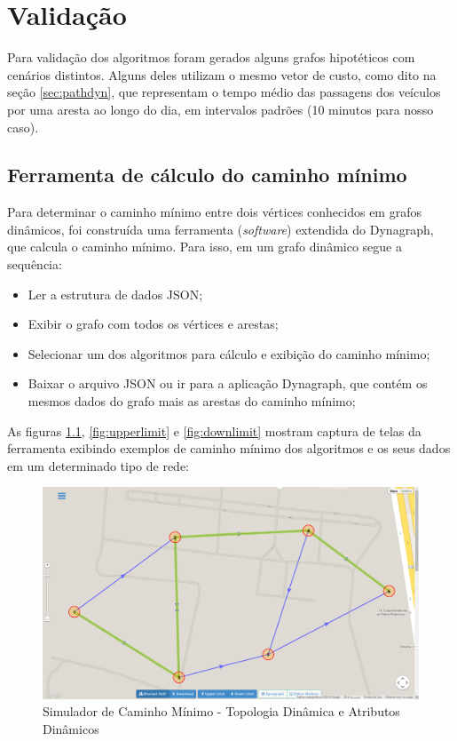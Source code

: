 \chapter{Validação}

Para validação dos algoritmos foram gerados alguns grafos hipotéticos com cenários distintos.
Alguns deles utilizam o mesmo vetor de custo, como dito na seção \ref{sec:pathdyn}, que representam
o tempo médio das passagens dos veículos por uma aresta ao longo do dia, em intervalos padrões (10 minutos para nosso caso).

\section{Ferramenta de cálculo do caminho mínimo}
Para determinar o caminho mínimo entre dois vértices conhecidos em grafos dinâmicos, foi construída uma ferramenta (\textit{software})
extendida do Dynagraph, que calcula o caminho mínimo. Para isso, em um grafo dinâmico segue a sequência:
\begin{itemize}
\item Ler a estrutura de dados JSON;
\item Exibir o grafo com todos os vértices e arestas;
\item Selecionar um dos algoritmos para cálculo e exibição do caminho mínimo;
\item Baixar o arquivo JSON ou ir para a aplicação Dynagraph, que contém os mesmos dados do grafo mais as arestas do caminho mínimo;
\end{itemize}

As figuras \ref{fig:shortestpath}, \ref{fig:upperlimit} e \ref{fig:downlimit} mostram captura de telas
da ferramenta exibindo exemplos de caminho mínimo dos algoritmos e os seus dados em um determinado tipo de rede:

\begin{figure}[htbp]
\centering
 \includegraphics[width=.90\textwidth]{figuras/validacao/shortestpath.png}
\caption{Simulador de Caminho Mínimo - Topologia Dinâmica e Atributos Dinâmicos}
\label{fig:shortestpath}
\end{figure}
\FloatBarrier

